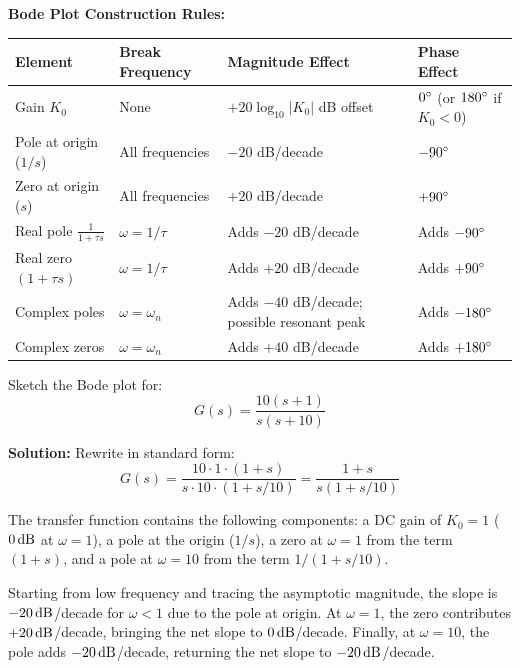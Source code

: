 \begin{keypoint}
\textbf{Bode Plot Construction Rules:}

\begin{center}
\begin{tabular}{p{3.5cm}p{3cm}p{3cm}p{3.5cm}}
\toprule
\textbf{Element} & \textbf{Break Frequency} & \textbf{Magnitude Effect} & \textbf{Phase Effect} \\
\midrule
Gain $K_0$ & None & $+20\log_{10}|K_0|$ dB offset & $0^\circ$ (or $180^\circ$ if $K_0 < 0$) \\
Pole at origin ($1/s$) & All frequencies & $-20$ dB/decade & $-90^\circ$ \\
Zero at origin ($s$) & All frequencies & $+20$ dB/decade & $+90^\circ$ \\
Real pole $\frac{1}{1+\tau s}$ & $\omega = 1/\tau$ & Adds $-20$ dB/decade & Adds $-90^\circ$ \\
Real zero $(1+\tau s)$ & $\omega = 1/\tau$ & Adds $+20$ dB/decade & Adds $+90^\circ$ \\
Complex poles & $\omega = \omega_n$ & Adds $-40$ dB/decade; possible resonant peak & Adds $-180^\circ$ \\
Complex zeros & $\omega = \omega_n$ & Adds $+40$ dB/decade & Adds $+180^\circ$ \\
\bottomrule
\end{tabular}
\end{center}
\end{keypoint}

\begin{examplebox}
\label{ex:combining}
Sketch the Bode plot for:
\begin{equation}
G(s) = \frac{10(s+1)}{s(s+10)}
\end{equation}

\textbf{Solution:} Rewrite in standard form:
\begin{equation}
G(s) = \frac{10 \cdot 1 \cdot (1 + s)}{s \cdot 10 \cdot (1 + s/10)} = \frac{1 + s}{s(1 + s/10)}
\end{equation}

The transfer function contains the following components: a DC gain of $K_0 = 1$ ($0\,\text{dB}$ at $\omega = 1$), a pole at the origin ($1/s$), a zero at $\omega = 1$ from the term $(1 + s)$, and a pole at $\omega = 10$ from the term $1/(1 + s/10)$.

Starting from low frequency and tracing the asymptotic magnitude, the slope is $-20\,\text{dB}$/decade for $\omega < 1$ due to the pole at origin. At $\omega = 1$, the zero contributes $+20\,\text{dB}$/decade, bringing the net slope to $0\,\text{dB}$/decade. Finally, at $\omega = 10$, the pole adds $-20\,\text{dB}$/decade, returning the net slope to $-20\,\text{dB}$/decade.
\end{examplebox}

